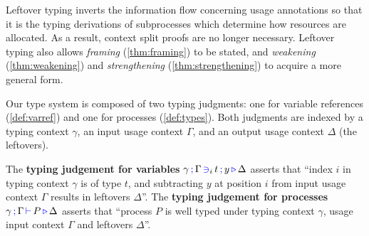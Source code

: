 \documentclass[]{llncs}
\newcommand{\type}[1]{\textcolor{blue}{\operatorname{#1}}}
\newcommand{\types}[4]{#1 \, \type{;} \, #2 \, \type{\vdash} \, #3 \, \type{\triangleright} \, #4}
\newcommand{\contains}[6]{#1 \, \type{;} \, #2 \, \type{\ni}_{#3} \, #4 \, \type{;} \, #5 \, \type{\triangleright} \, #6}
\begin{document}
Leftover typing inverts the information flow concerning usage annotations so that it is the typing derivations of subprocesses which determine how resources are allocated.
As a result, context split proofs are no longer necessary.
Leftover typing also allows \emph{framing} (\autoref{thm:framing}) to be stated, and \emph{weakening} (\autoref{thm:weakening}) and \emph{strengthening} (\autoref{thm:strengthening}) to acquire a more general form.

Our type system is composed of two typing judgments: one for variable references (\autoref{def:varref}) and one for processes (\autoref{def:types}).
Both judgments are indexed by a typing context $\gamma$, an input usage context $\Gamma$, and an output usage context $\Delta$ (the leftovers).

The \textbf{typing judgement for variables} $\contains{\gamma}{\Gamma}{i}{t}{y}{\Delta}$ asserts that ``index $i$ in typing context $\gamma$ is of type $t$, and subtracting $y$ at position $i$ from input usage context $\Gamma$ results in leftovers $\Delta$''.
The \textbf{typing judgement for processes} $\types{\gamma}{\Gamma}{P}{\Delta}$ asserts that ``process $P$ is well typed under typing context $\gamma$, usage input context $\Gamma$ and leftovers $\Delta$''.
\end{document}
